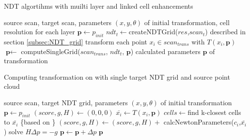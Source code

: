 \begin{algorithm}
\label{alg:p2d_ndt}
    \caption{\gls{NDT} algortihms with muilti layer and linked cell enhancements}
\begin{algorithmic}[1]
 \Require source scan, target scan,  parameters $(x,y,\theta)$ of initial transformation, cell resolution for each layer
	 \State $\textbf{p} \gets p_{init}$
		 \State $ndt_{t} \gets$createNDTGrid($res$,$scan_{t}$)
		 \Comment described in section \ref{subsec:NDT_grid}
		 \State transform each point $x_{i} \in scan_{trans}$ with $T(x_{i},\textbf{p})$
		 \State $\textbf{p} \gets$ computeSingleGrid($scan_{trans}$, $ndt_{t}$, $\textbf{p}$)
	 \EndFor
	 \State \Return calculated parameters $\textbf{p}$ of transformation
 \EndFunction
\end{algorithmic}
\end{algorithm}
\begin{algorithm}
\label{alg:p2d_ndt_single}
\caption{Computing transformation on with single target \gls{NDT} grid and source point cloud}
\begin{algorithmic}[1]
 \Require source scan, target NDT grid,  parameters $(x,y,\theta)$ of initial transformation
		 \State $\textbf{p} \gets p_{init}$
		 \State $(score, g,H) \gets (0,0,0)$
			 \State $\bar{x_{i}} \gets T(x_{i},\textbf{p})$
			 \State $cells \gets $find k-closest cells to $\bar{x_{i}} $
			 \State \{based on \cite{magnusson09}\}
				 \State $(score,g,H) \gets (score,g,H)  + $ calcNewtonParameters($c_{i}$,$\bar{x_{i}}$)
			 \EndFor 
		 \EndFor
		 \State solve $H\varDelta p = - g$
		 \State $\textbf{p} \gets \textbf{p} + \varDelta p$
	 \EndWhile
	 \State \Return $\textbf{p}$
 \EndFunction
\end{algorithmic}
\end{algorithm}
         
 

